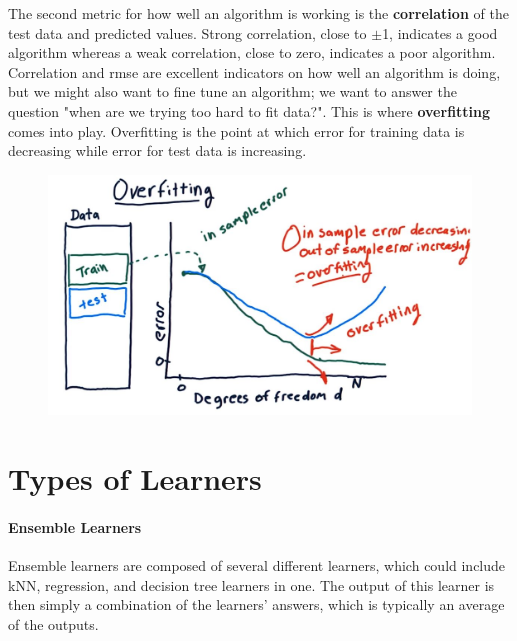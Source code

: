 The second metric for how well an algorithm is working is the \textbf{correlation} of the test data and predicted values. Strong correlation, close to $\pm$1, indicates a good algorithm whereas a weak correlation, close to zero, indicates a poor algorithm. Correlation and \ac{rmse} are excellent indicators on how well an algorithm is doing, but we might also want to fine tune an algorithm; we want to answer the question "when are we trying too hard to fit data?". This is where \textbf{overfitting} comes into play. Overfitting is the point at which error for training data is decreasing while error for test data is increasing.
\begin{figure}[h]
\centering
\includegraphics[scale=.6]{images/overfit.JPG}
\end{figure}

\section{Types of Learners}

\paragraph{Ensemble Learners}
Ensemble learners are composed of several different learners, which could include \ac{kNN}, regression, and decision tree learners in one. The output of this learner is then simply a combination of the learners' answers, which is typically an average of the outputs.

